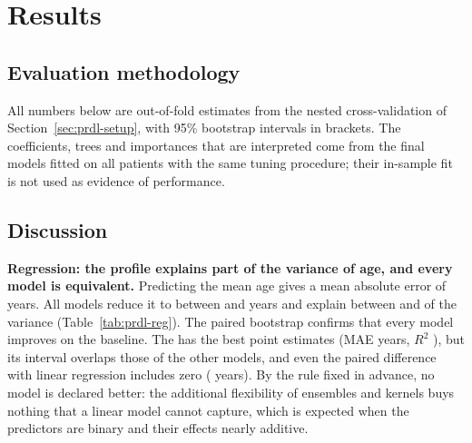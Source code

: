 \section{Results}\label{sec:prdl-results}

\subsection{Evaluation methodology}

All numbers below are out-of-fold estimates from the nested cross-validation of
Section~\ref{sec:prdl-setup}, with 95\% bootstrap intervals in brackets. The coefficients, trees and
importances that are interpreted come from the final models fitted on all patients with the same
tuning procedure; their in-sample fit is not used as evidence of performance.

\subsection{Discussion}

\textbf{Regression: the profile explains part of the variance of age, and every model is
equivalent.} Predicting the mean age gives a mean absolute error of \RegBaseMAE{} years. All models
reduce it to between \RegMinMAE{} and \RegMaxMAE{} years and explain between \RegMinRTwo{} and
\RegMaxRTwo{} of the variance (Table~\ref{tab:prdl-reg}). The paired bootstrap confirms that every
model improves on the baseline. The \RegBest{} has the best point estimates (MAE \RegBestMAE{}
\RegBestMAECI{} years, $R^2$ \RegBestRTwo{} \RegBestRTwoCI), but its interval overlaps those of the
other \RegNTies{} models, and even the paired difference with linear regression includes zero
(\RegDiffOLSBest{} \RegDiffOLSBestCI{} years). By the rule fixed in advance, no model is declared
better: the additional flexibility of ensembles and kernels buys nothing that a linear model cannot
capture, which is expected when the predictors are binary and their effects nearly additive.

\begin{table}[H]
\centering
\caption{Regression of age at diagnosis: out-of-fold metrics with 95\% bootstrap intervals, and
$R^2$ per outer fold (mean $\pm$ SD).}
\label{tab:prdl-reg}
\resizebox{\textwidth}{!}{}
\end{table}

